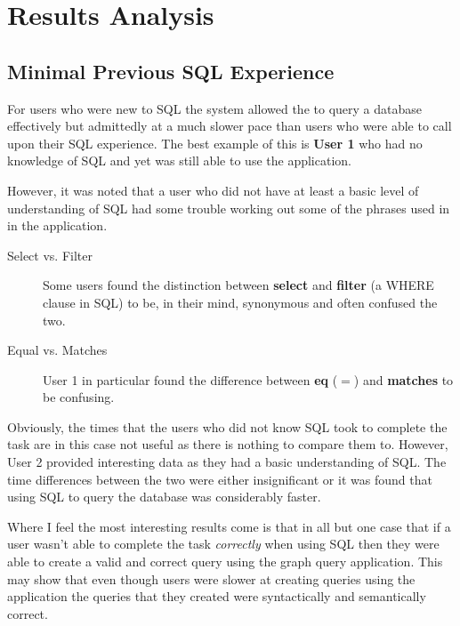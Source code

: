 \section{Results Analysis}

\subsection{Minimal Previous SQL Experience}

For users who were new to SQL the system allowed the to query a database
effectively but admittedly at a much slower pace than users who were able to
call upon their \ac{SQL} experience. The best example of this is \textbf{User
1} who had no knowledge of SQL and yet was still able to use the application.

However, it was noted that a user who did not have at least a basic level of
understanding of \ac{SQL} had some trouble working out some of the phrases used
in in the application.

\begin{description}

\item[Select vs. Filter] \hfill

Some users found the distinction between \textbf{select} and \textbf{filter} (a
WHERE clause in \ac{SQL}) to be, in their mind, synonymous and often confused
the two.

\item[Equal vs. Matches] \hfill

User 1 in particular found the difference between \textbf{eq} ($=$) and
\textbf{matches} to be confusing.

\end{description}

Obviously, the times that the users who did not know \ac{SQL} took to complete
the task are in this case not useful as there is nothing to compare them to.
However, User 2 provided interesting data as they had a basic understanding of
\ac{SQL}. The time differences between the two were either insignificant or it
was found that using \ac{SQL} to query the database was considerably faster.

Where I feel the most interesting results come is that in all but one case that
if a user wasn't able to complete the task \emph{correctly} when using SQL then
they were able to create a valid and correct query using the graph query
application. This may show that even though users were slower at creating
queries using the application the queries that they created were syntactically
and semantically correct.

